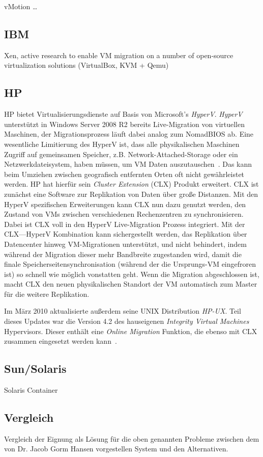 vMotion \ldots

\subsection{IBM}
Xen, active research to enable VM migration on a number of open-source
virtualization solutions (VirtualBox, KVM + Qemu)

\subsection{HP}
HP bietet Virtualisierungsdienste auf Basis von Microsoft's
\emph{HyperV}. \emph{HyperV} unterstützt in Windows Server 2008 R2
bereits Live-Migration von virtuellen Maschinen, der Migrationsprozess
läuft dabei analog zum NomadBIOS ab. Eine wesentliche Limitierung des
HyperV ist, dass alle physikalischen Maschinen Zugriff auf gemeinsamen
Speicher, z.B. Network-Attached-Storage oder ein Netzwerkdateisystem,
haben müssen, um VM Daten auszutauschen~\cite{hp2010hyperV}. Das kann
beim Umziehen zwischen geografisch entfernten Orten oft nicht
gewährleistet werden. HP hat hierfür sein \emph{Cluster Extension}
(CLX) Produkt erweitert. CLX ist zunächst eine Software zur
Replikation von Daten über große Distanzen. Mit den HyperV
spezifischen Erweiterungen kann CLX nun dazu genutzt werden, den
Zustand von VMs zwischen verschiedenen Rechenzentren zu
synchronisieren. Dabei ist CLX voll in den HyperV Live-Migration
Prozess integriert. Mit der CLX---HyperV Kombination kann
sichergestellt werden, das Replikation über Datencenter hinweg
VM-Migrationen unterstützt, und nicht behindert, indem während der
Migration dieser mehr Bandbreite zugestanden wird, damit die finale
Speicherseitensynchronisation (während der die Ursprungs-VM
eingefroren ist) so schnell wie möglich vonstatten geht. Wenn die
Migration abgeschlossen ist, macht CLX den neuen physikalischen
Standort der VM automatisch zum Master für die weitere Replikation.

Im März 2010 aktualisierte außerdem seine UNIX Distribution
\emph{HP-UX}. Teil dieses Updates war die Version 4.2 des hauseigenen
\emph{Integrity Virtual Machines} Hypervisors. Dieser enthält eine
\emph{Online Migration} Funktion, die ebenso mit CLX zusammen
eingesetzt werden kann~\cite{hp2010integrity}.

\subsection{Sun/Solaris}
Solaris Container

\subsection{Vergleich}
Vergleich der Eignung als Lösung für die oben genannten Probleme
zwischen dem von Dr. Jacob Gorm Hansen vorgestellen System und den Alternativen.



